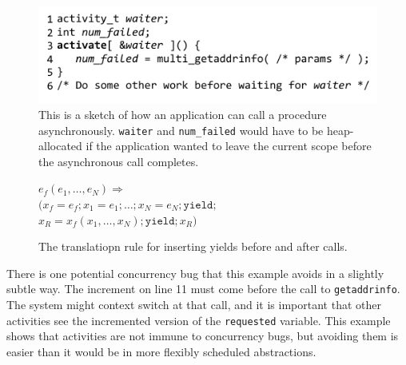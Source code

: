 \documentclass[9pt,preprint]{sigplanconf}
\begin{document}
\begin{figure}
\includegraphics{multi_getaddrinfo_async_call}
\caption{This is a sketch of how an application can call a procedure asynchronously.
\texttt{waiter} and \texttt{num\_failed} would have to be heap-allocated if the application wanted to leave the current scope before the asynchronous call completes.}
\label{fig:charcoal_multidns_async_call}
\end{figure}

\begin{figure}
  $e_f(e_1, \ldots, e_N) \Rightarrow$ \\
  \hspace*{1em} $( x_f=e_f; x_1=e_1; \ldots; x_N=e_N; \mathtt{yield};$ \\
  \hspace*{2em} $x_R=x_f(x_1, \ldots, x_N); \mathtt{yield}; x_R )$
  \caption{The translatiopn rule for inserting yields before and after calls.}
    \label{fig:translation}
\end{figure}

There is one potential concurrency bug that this example avoids in a slightly subtle way.
The increment on line 11 must come before the call to \texttt{getaddrinfo}.
The system might context switch at that call, and it is important that other activities see the incremented version of the \texttt{requested} variable.
This example shows that activities are not immune to concurrency bugs, but avoiding them is easier than it would be in more flexibly scheduled abstractions.





\end{document}

